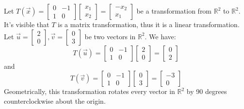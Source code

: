 \begin{eg}
    Let $T(\vec{x}) = \begin{bmatrix}
        0 & -1 \\
        1 & 0
    \end{bmatrix} \begin{bmatrix}
        x_1 \\ x_2
    \end{bmatrix} = \begin{bmatrix}
        -x_2 \\ x_1
    \end{bmatrix}$ be a transformation from $\mathbb{R}^2$ to $\mathbb{R}^2$. It's visible that $T$ is a matrix transformation, thus it is a linear transformation. \\
    Let $\vec{u} = \begin{bmatrix}
        2 \\ 0
    \end{bmatrix}, \vec{v} = \begin{bmatrix}
        0 \\ 3
    \end{bmatrix}$ be two vectors in $\mathbb{R}^2$. We have:
    \[
        T(\vec{u}) = \begin{bmatrix}
            0 & -1 \\
            1 & 0
        \end{bmatrix} \begin{bmatrix}
            2 \\ 0
        \end{bmatrix} = \begin{bmatrix}
            0 \\ 2
        \end{bmatrix}
    \]
    and
    \[
        T(\vec{v}) = \begin{bmatrix}
            0 & -1 \\
            1 & 0
        \end{bmatrix} \begin{bmatrix}
            0 \\ 3
        \end{bmatrix} = \begin{bmatrix}
            -3 \\ 0
        \end{bmatrix}
    \]
    Geometrically, this transformation rotates every vector in $\mathbb{R}^2$ by 90 degrees counterclockwise about the origin.
\end{eg}

